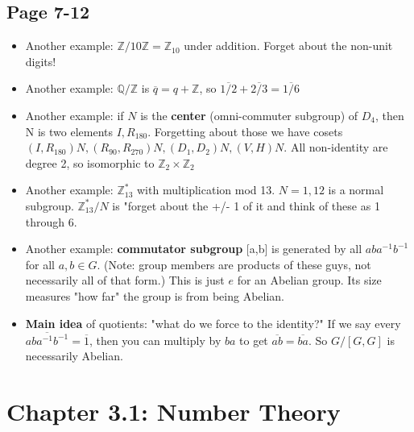\documentclass[11pt, oneside]{article}   	%
\begin{document}
\subsection{Page 7-12}
\begin{itemize}
\item Another example: $\mathbb{Z} / 10\mathbb{Z} = \mathbb{Z}_{10}$ under addition.  Forget about the non-unit digits!
\item Another example: $\mathbb{Q} / \mathbb{Z}$ is $\overline{q} = q + \mathbb{Z}$, so $\overline{1/2} + \overline{2/3} = \overline{1/6}$
\item Another example: if $N$ is the \textbf{center} (omni-commuter subgroup) of $D_4$, then N is two elements $I, R_{180}$.  Forgetting about those we have cosets $(I, R_{180})N, (R_{90}, R_{270})N, (D_1, D_2)N, (V,H)N$.  All non-identity are degree 2, so isomorphic to $\mathbb{Z}_2 \times \mathbb{Z}_2$
\item Another example: $\mathbb{Z}_{13}^*$ with multiplication mod 13.  $N = {1,12}$ is a normal subgroup.  $\mathbb{Z}_{13}^* / N$ is "forget about the +/- 1 of it and think of these as 1 through 6.  
\item Another example: \textbf{commutator subgroup} [a,b] is generated by all $aba^{-1}b^{-1}$ for all $a, b \in G$.  (Note: group members are products of these guys, not necessarily all of that form.)  This is just $e$ for an Abelian group.  Its size measures "how far" the group is from being Abelian.  
\item \textbf{Main idea} of quotients: "what do we force to the identity?"  If we say every $\overline{aba^{-1}b^{-1}} = \overline{1}$, then you can multiply by $ba$ to get $\overline{ab} =  \overline{ba}$.  So $G / [G,G]$ is necessarily Abelian.
 \end{itemize}


\section{Chapter 3.1: Number Theory}
\end{document}
